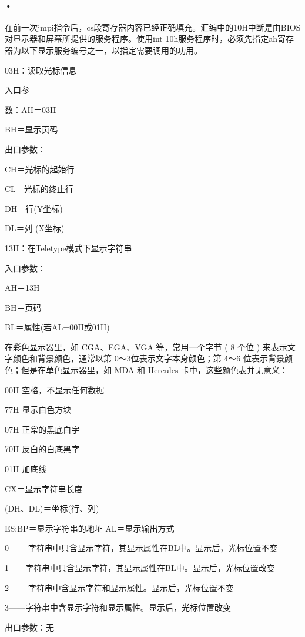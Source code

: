 \documentclass[12pt]{article}
\begin{document}
\paragraph{•}
在前一次jmpi指令后，cs段寄存器内容已经正确填充。汇编中的10H中断是由BIOS对显示器和屏幕所提供的服务程序。使用int 10h服务程序时，必须先指定ah寄存器为以下显示服务编号之一，以指定需要调用的功用。
\begin{list}{•}{•}
\item 03H：读取光标信息
\item 入口参 
\item 数：AH＝03H
\item BH＝显示页码
\item 出口参数：
\item CH＝光标的起始行
\item CL＝光标的终止行
\item DH＝行(Y坐标)
\item DL＝列 (X坐标)
\item 
\item 13H：在Teletype模式下显示字符串
\item 入口参数：
\item AH＝13H
\item BH＝页码
\item BL＝属性(若AL=00H或01H)
\item 在彩色显示器里，如 CGA、EGA、VGA 等，常用一个字节 ( 8 个位 ) 来表示文字颜色和背景颜色，通常以第 0～3位表示文字本身颜色；第 4～6 位表示背景颜色；但是在单色显示器里，如 MDA 和 Hercules 卡中，这些颜色表并无意义：
\item 00H 	空格，不显示任何数据
\item 77H 	显示白色方块
\item 07H 	正常的黑底白字
\item 70H 	反白的白底黑字
\item 01H 	加底线
\item CX＝显示字符串长度
\item (DH、DL)＝坐标(行、列)
\item ES:BP＝显示字符串的地址 AL＝显示输出方式
\item 0—— 字符串中只含显示字符，其显示属性在BL中。显示后，光标位置不变
\item 1——字符串中只含显示字符，其显示属性在BL中。显示后，光标位置改变
\item 2 ——字符串中含显示字符和显示属性。显示后，光标位置不变
\item 3——字符串中含显示字符和显示属性。显示后，光标位置改变
\item 出口参数：无
\end{list}
\end{document}
